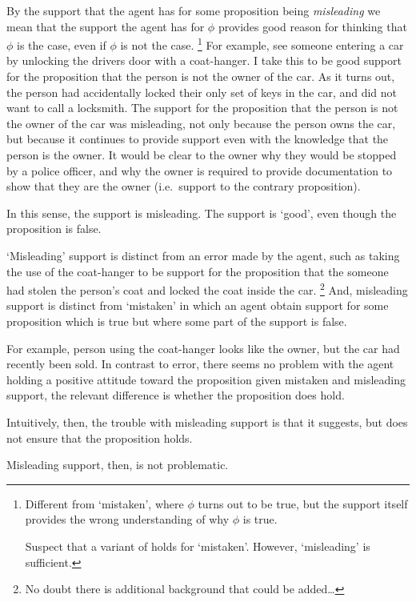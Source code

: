 \begin{note}
  By the support that the agent has for some proposition being \emph{misleading} we mean that the support the agent has for \(\phi\) provides good reason for thinking that \(\phi\) is the case, even if \(\phi\) is not the case.\nolinebreak
  \footnote{
    Different from `mistaken', where \(\phi\) turns out to be true, but the support itself provides the wrong understanding of why \(\phi\) is true.

    Suspect that a variant of \nI{} holds for `mistaken'.
    However, `misleading' is sufficient.
  }
  For example, see someone entering a car by unlocking the drivers door with a coat-hanger.
  I take this to be good support for the proposition that the person is not the owner of the car.
  As it turns out, the person had accidentally locked their only set of keys in the car, and did not want to call a locksmith.
  The support for the proposition that the person is not the owner of the car was misleading, not only because the person owns the car, but because it continues to provide support even with the knowledge that the person is the owner.
  It would be clear to the owner why they would be stopped by a police officer, and why the owner is required to provide documentation to show that they are the owner (i.e.\ support to the contrary proposition).

  In this sense, the support is misleading.
  The support is `good', even though the proposition is false.

  `Misleading' support is distinct from an error made by the agent, such as taking the use of the coat-hanger to be support for the proposition that the someone had stolen the person's coat and locked the coat inside the car.\nolinebreak
  \footnote{
    No doubt there is additional background that could be added\dots
  }
  And, misleading support is distinct from `mistaken' in which an agent obtain support for some proposition which is true but where some part of the support is false.

  For example, person using the coat-hanger looks like the owner, but the car had recently been sold.
  In contrast to error, there seems no problem with the agent holding a positive attitude toward the proposition given mistaken and misleading support, the relevant difference is whether the proposition does hold.

  Intuitively, then, the trouble with misleading support is that it suggests, but does not ensure that the proposition holds.

  Misleading support, then, is not problematic.
\end{note}

